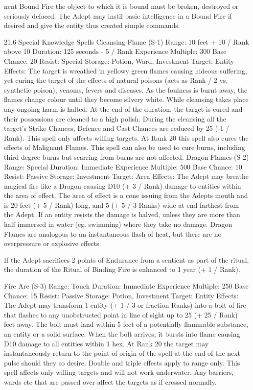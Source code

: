\documentclass[a4paper]{article}
\begin{document}
\begin{multicols}{3}
nent Bound Fire the object to which it is bound
must be broken, destroyed or seriously defaced.
The Adept may instil basic intelligence in a Bound
Fire if desired and give the entity thus created
simple commands.

21.6 Special Knowledge Spells
Cleansing Flame (S-1)
Range: 10 feet + 10 / Rank above 10
Duration: 125 seconds - 5 / Rank
Experience Multiple: 300
Base Chance: 20%
Resist: Special
Storage: Potion, Ward, Investment
Target: Entity
Effects: The target is wreathed in yellowy green
flames causing hideous suffering, yet curing the
target of the effects of natural poisons (acts as
Rank / 2 vs. synthetic poison), venoms, fevers and
diseases. As the foulness is burnt away, the flames
change colour until they become silvery white.
While cleansing takes place any ongoing harm is
halted. At the end of the duration, the target is
cured and their possessions are cleaned to a high
polish. During the cleansing all the target’s Strike
Chances, Defence and Cast Chances are reduced
by 25 (-1 / Rank). This spell only affects willing
targets. At Rank 20 this spell also cures the effects
of Malignant Flames. This spell can also be used to
cure burns, including third degree burns but scarring from burns are not affected.
Dragon Flames (S-2)
Range: Special
Duration: Immediate
Experience Multiple: 500
Base Chance: 10%
Resist: Passive
Storage: Investment
Target: Area
Effects: The Adept may breathe magical fire like a
Dragon causing D10 (+ 3 / Rank) damage to entities within the area of effect. The area of effect is a
cone issuing from the Adepts mouth and is 20 feet
(+ 5 / Rank) long, and 5 (+ 5 / 3 Ranks) wide at
end farthest from the Adept. If an entity resists the
damage is halved, unless they are more than half
immersed in water (eg. swimming) where they take
no damage. Dragon Flames are analogous to an
instantaneous flash of heat, but there are no overpressure or explosive effects.

If the Adept sacrifices 2 points of Endurance from
a sentient as part of the ritual, the duration of the
Ritual of Binding Fire is enhanced to 1 year (+ 1 /
Rank).

Fire Arc (S-3)
Range: Touch
Duration: Immediate
Experience Multiple: 250
Base Chance: 15%
Resist: Passive
Storage: Potion, Investment
Target: Entity
Effects: The Adept may transform 1 entity (+ 1 / 3
or fraction Ranks) into a bolt of fire that flashes to
any unobstructed point in line of sight up to 25 (+
25 / Rank) feet away. The bolt must land within 5
feet of a potentially flammable substance, an entity
or a solid surface. When the bolt arrives, it bursts
into flame causing D10 damage to all entities
within 1 hex. At Rank 20 the target may instantaneously return to the point of origin of the spell at
the end of the next pulse should they so desire.
Double and triple effects apply to range only. This
spell affects only willing targets and will not work
underwater. Any barriers, wards etc that are passed
over affect the targets as if crossed normally.


\end{multicols}
\end{document}
